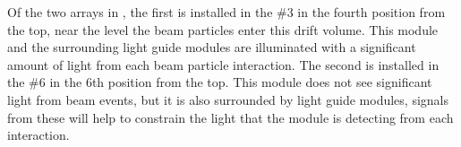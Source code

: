 

Of the two  arrays in , the first is installed in the  \#3 in the fourth position from the top, near the level the beam particles enter this drift volume. This module and the surrounding light guide modules are illuminated with a significant amount of light from each beam particle interaction.
The second is installed in the  \#6 in the 6th position from the top.  This module does not see significant light from beam events, but it is also surrounded by light guide modules, signals from these will help to constrain the light that the module is detecting from each interaction.

